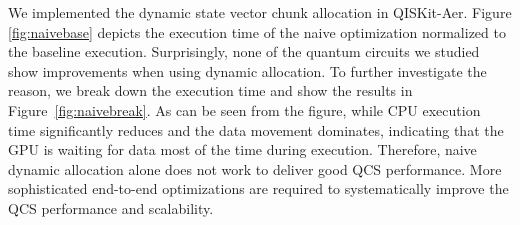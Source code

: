 We implemented the dynamic state vector chunk allocation in QISKit-Aer. Figure \ref{fig:naivebase} depicts the execution time of the naive optimization normalized to the baseline execution. Surprisingly, none of the quantum circuits we studied show improvements when using dynamic allocation. To further investigate the reason, we break down the execution time and show the results in Figure~\ref{fig:naivebreak}.
As can be seen from the figure, while CPU execution time significantly reduces and the data movement dominates, indicating that the GPU is waiting for data most of the time during execution.
Therefore, naive dynamic allocation alone does not work to deliver good QCS performance. More sophisticated end-to-end optimizations are required to systematically improve the QCS performance and scalability. 

